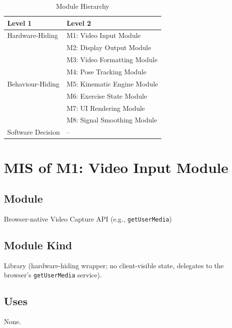 \documentclass[12pt, titlepage]{article}
\begin{document}
\begin{table}[h!]
\centering
\begin{tabular}{p{} p{}}
\toprule
\textbf{Level 1} & \textbf{Level 2}\\
\midrule

{Hardware-Hiding} & M1: Video Input Module \\
\midrule

\multirow{7}{0.3\textwidth}{Behaviour-Hiding} & M2: Display Output Module\\
& M3: Video Formatting Module\\
& M4: Pose Tracking Module\\
& M5: Kinematic Engine Module\\
& M6: Exercise State Module\\
& M7: UI Rendering Module\\
& M8: Signal Smoothing Module\\
\midrule

\multirow{1}{0.3\textwidth}{Software Decision} & -- \\
\bottomrule

\end{tabular}
\caption{Module Hierarchy}
\label{TblMH}
\end{table}

\newpage

\section{MIS of M1: Video Input Module} \label{M1}

\subsection{Module}
Browser-native Video Capture API (e.g., \texttt{getUserMedia})

\subsection{Module Kind}
Library (hardware-hiding wrapper; no client-visible state, delegates to
the browser's \texttt{getUserMedia} service).

\subsection{Uses}
None.
\end{document}
